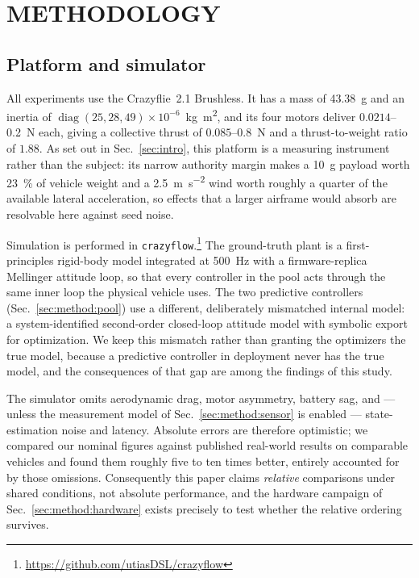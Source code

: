 \section{METHODOLOGY}
\label{sec:method}

\subsection{Platform and simulator}
\label{sec:method:platform}

All experiments use the Crazyflie~2.1 Brushless. It has a mass of
\SI{43.38}{\gram} and an inertia of
$\operatorname{diag}(25, 28, 49)\times10^{-6}$~\si{\kilogram\meter\squared}, and its
four motors deliver $0.0214$--\SI{0.2}{\newton} each, giving a collective thrust of
$0.085$--\SI{0.8}{\newton} and a thrust-to-weight ratio of $1.88$. As set out in
Sec.~\ref{sec:intro}, this platform is a measuring instrument rather than the subject:
its narrow authority margin makes a \SI{10}{\gram} payload worth \SI{23}{\percent} of
vehicle weight and a \SI{2.5}{\meter\per\second\squared} wind worth roughly a quarter of
the available lateral acceleration, so effects that a larger airframe would absorb are
resolvable here against seed noise.

Simulation is performed in \texttt{crazyflow}.\footnote{\url{https://github.com/utiasDSL/crazyflow}} The ground-truth plant is
a first-principles rigid-body model integrated at \SI{500}{\hertz} with a
firmware-replica Mellinger attitude loop, so that every controller in the pool acts
through the same inner loop the physical vehicle uses. The two predictive controllers
(Sec.~\ref{sec:method:pool}) use a different, deliberately mismatched internal model: a
system-identified second-order closed-loop attitude model with symbolic export for
optimization. We keep this mismatch rather than granting the optimizers the true model,
because a predictive controller in deployment never has the true model, and the
consequences of that gap are among the findings of this study.

The simulator omits aerodynamic drag, motor asymmetry, battery sag, and --- unless the
measurement model of Sec.~\ref{sec:method:sensor} is enabled --- state-estimation noise
and latency. Absolute errors are therefore optimistic; we compared our nominal figures
against published real-world results on comparable vehicles and found them roughly five
to ten times better, entirely accounted for by those omissions. Consequently this paper
claims \emph{relative} comparisons under shared conditions, not absolute performance,
and the hardware campaign of Sec.~\ref{sec:method:hardware} exists precisely to test
whether the relative ordering survives.

